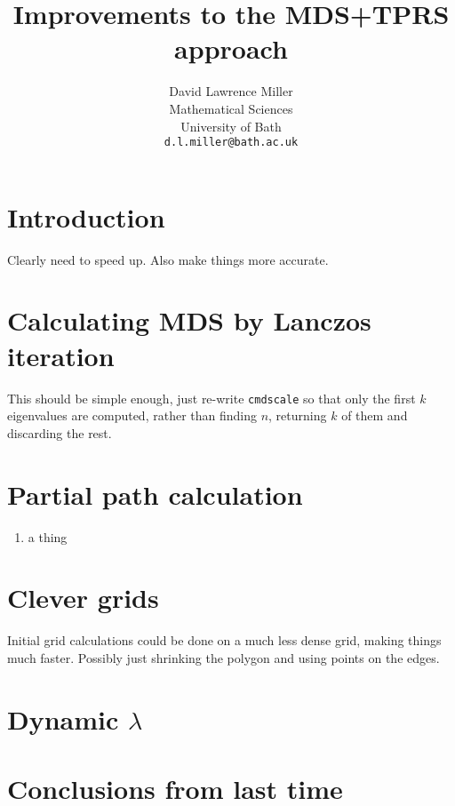 \documentclass[a4paper,10pt]{article}
\title{Improvements to the MDS+TPRS approach}
\author{David Lawrence Miller\\Mathematical Sciences\\University of Bath\\\texttt{d.l.miller@bath.ac.uk}}
\begin{document}
 
 
 
\newtheorem{thm}{Theorem}[section]
 
\newtheorem{defn}{Definition}[section]
 
\maketitle

\section{Introduction}

Clearly need to speed up. Also make things more accurate.

\section{Calculating MDS by Lanczos iteration}

This should be simple enough, just re-write \texttt{cmdscale} so that only the first $k$ eigenvalues are computed, rather than finding $n$, returning $k$ of them and discarding the rest.

\section{Partial path calculation}

\begin{enumerate}
\item a thing
\end{enumerate}

\section{Clever grids}

Initial grid calculations could be done on a much less dense grid, making things much faster. Possibly just shrinking the polygon and using points on the edges.

\section{Dynamic $\lambda$}



\section{Conclusions from last time}
\end{document}
